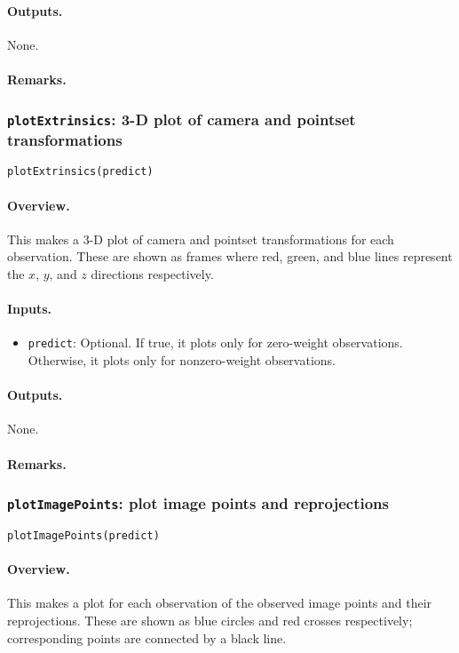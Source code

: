 \paragraph{Outputs.} None.
\paragraph{Remarks.}

\subsubsection{\texttt{plotExtrinsics}: 3-D plot of camera and pointset transformations}
\texttt{plotExtrinsics(predict)}
\paragraph{Overview.}
This makes a 3-D plot of camera and pointset transformations for each observation.
These are shown as frames where red, green, and blue lines represent the $x$, $y$,
and $z$ directions respectively.
\paragraph{Inputs.}
\begin{itemize}
	\item \texttt{predict}: Optional. If true, it plots only for zero-weight 
		observations. Otherwise, it plots only for nonzero-weight observations.
\end{itemize}
\paragraph{Outputs.} None.
\paragraph{Remarks.}

\subsubsection{\texttt{plotImagePoints}: plot image points and reprojections}
\texttt{plotImagePoints(predict)}
\paragraph{Overview.}
This makes a plot for each observation of the observed image points and their reprojections.
These are shown as blue circles and red crosses respectively; corresponding points
are connected by a black line.
